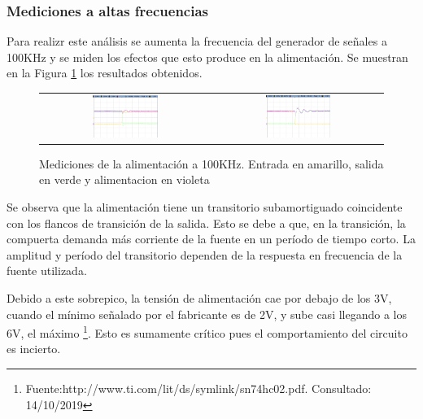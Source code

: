\subsubsection{Mediciones a altas frecuencias}
Para realizr este an\'alisis se aumenta la frecuencia del generador de se\~nales a 100KHz y se miden los efectos que esto produce en la alimentaci\'on.
Se muestran en la Figura \ref{fig:DC_NOCAP} los resultados obtenidos.
\begin{figure}[H]
    \centering
    \begin{tabular}{c c}
        \includegraphics[width=0.4\textwidth]{../EJ4/Recursos/DC_VAR_FALL} &
        \includegraphics[width=0.4\textwidth]{../EJ4/Recursos/DC_VAR_RISE}
    \end{tabular}
    \caption{Mediciones de la alimentaci\'on a 100KHz. Entrada en amarillo, salida en verde y alimentacion en violeta}
    \label{fig:DC_NOCAP}
\end{figure}

Se observa que la alimentaci\'on tiene un transitorio subamortiguado coincidente con los flancos de transici\'on de la salida. Esto se debe a que, en la transici\'on, la compuerta demanda m\'as corriente de la fuente en un per\'iodo de tiempo corto. La amplitud y per\'iodo del transitorio dependen de la respuesta en frecuencia de la fuente utilizada. 

Debido a este sobrepico, la tensi\'on de alimentaci\'on cae por debajo de los 3V, cuando el m\'inimo se\~nalado por el fabricante es de 2V, y sube casi llegando a los 6V, el m\'aximo \footnote{Fuente:http://www.ti.com/lit/ds/symlink/sn74hc02.pdf. Consultado: 14/10/2019}. Esto es sumamente cr\'itico pues el comportamiento del circuito es incierto.

